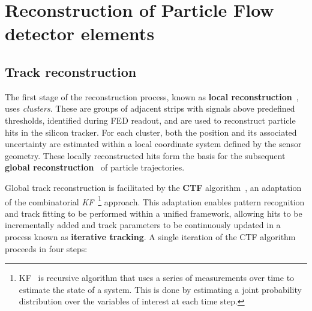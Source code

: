 \section{Reconstruction of Particle Flow detector elements}
\label{Section:Chapter4_Reconstruction_of_PF_elements}
\subsection{Track reconstruction}
The first stage of the reconstruction process, known as \textbf{local reconstruction}~\cite{CMS_TrackerPerformance_2014,CMS_Track_Reconstruction_Run2_3}, uses \textit{clusters}. These are groups of adjacent strips with signals above predefined thresholds, identified during \ac{FED} readout, and are used to reconstruct particle hits in the silicon tracker. For each cluster, both the position and its associated uncertainty are estimated within a local coordinate system defined by the sensor geometry. These locally reconstructed hits form the basis for the subsequent \textbf{global reconstruction}~\cite{CMS_TrackerPerformance_2014,CMS_Track_Reconstruction_Run2_3} of particle trajectories.

Global track reconstruction is facilitated by the \textbf{\ac{CTF}} algorithm~\cite{CMS_TrackerPerformance_2014,CMS_Track_Reconstruction_Run2_3}, an adaptation of the combinatorial \textit{\ac{KF}}~\cite{KF_1,KF_2,KF_3}\footnote{\ac{KF}~\cite{KF_4} is recursive algorithm that uses a series of measurements over time to estimate the state of a system. This is done by estimating a joint probability distribution over the variables of interest at each time step.} approach. This adaptation enables pattern recognition and track fitting to be performed within a unified framework, allowing hits to be incrementally added and track parameters to be continuously updated in a process known as \textbf{iterative tracking}. A single iteration of the \ac{CTF} algorithm proceeds in four steps:

